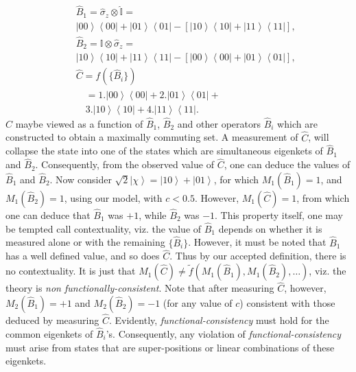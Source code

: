 \documentclass[doublecol,british]{epl2}
\theoremstyle{plain}
\theoremstyle{plain}
\theoremstyle{definition}
\theoremstyle{remark}
\theoremstyle{remark}
\theoremstyle{remark}
\theoremstyle{plain}
\theoremstyle{plain}
\theoremstyle{plain}
\theoremstyle{definition}
\theoremstyle{definition}
\begin{document}
\begin{eqnarray*}
&&\hat{B}_{1}\!=\!\hat{\sigma}_{z}\otimes\hat{\mathbb{I}}\!=\\
&&\!\left|00\right\rangle
\left\langle 00\right|+\left|01\right\rangle
\left\langle 01\right|-\left[\left|10\right\rangle
\left\langle 10\right|+\left|11\right\rangle
\left\langle 11\right|\right], \\
&&\hat{B}_{2}\!=\!\hat{\mathbb{I}}\otimes\hat{\sigma}_{z}\!=\\
&&\!\left|10\right\rangle
\left\langle 10\right|+\left|11\right\rangle
\left\langle 11\right|-\left[\left|00\right\rangle
\left\langle 00\right|+\left|01\right\rangle
\left\langle 01\right|\right], \\
&&\hat{C}=\!f(\{\hat{B}_{i}\}) \\
&&\quad=1.\left|00\right\rangle \left\langle
00\right|+2.\left|01\right\rangle \left\langle
01\right|+ \\
&&\! \quad
3.\left|10\right\rangle \left\langle
10\right|+4.\left|11\right\rangle \left\langle
11\right|. 
\end{eqnarray*}
$\hat{C}$ maybe viewed as a function of
$\hat{B}_{1}$, $\hat{B}_{2}$ and other operators
$\hat{B}_{i}$ which are constructed to obtain a
maximally commuting set. A measurement of
$\hat{C}$, will collapse the state into one of the
states which are simultaneous eigenkets of
$\hat{B}_{1}$ and $\hat{B}_{2}$. Consequently,
from the observed value of $\hat{C}$, one can
deduce the values of $\hat{B}_{1}$ and
$\hat{B}_{2}$. Now consider
$\sqrt{2}\left|\chi\right\rangle
=\left|10\right\rangle +\left|01\right\rangle $,
for which $M_{1}(\hat{B}_{1})=1$, and
$M_{1}(\hat{B}_{2})=1$, using our model, with
$c<0.5$. However, $M_{1}(\hat{C})=1$, from which
one can deduce that $\hat{B}_{1}$ was $+1$, while
$\hat{B}_{2}$ was $-1$.  This property itself, one
may be tempted call contextuality, viz.  the value
of $\hat{B}_{1}$ depends on whether it is measured
alone or with the remaining $\{\hat{B}_{i}\}$.
However, it must be noted that $\hat{B}_{1}$ has a
well defined value, and so does $\hat{C}$. Thus by
our accepted definition, there is no
contextuality. It is just that $M_{1}(\hat{C})\neq
\tilde
f(M_{1}(\hat{B}_{1}),M_{1}(\hat{B}_{2}),\dots)$,
viz. the theory is \emph{non functionally-consistent}. Note that
after measuring $\hat{C}$, however,
$M_{2}(\hat{B}_{1})=+1$ and
$M_{2}(\hat{B}_{2})=-1$ (for any value of $c$)
consistent with those deduced by measuring
$\hat{C}$.  Evidently, \emph{functional-consistency} must hold
for the common eigenkets of $\hat{B}_{i}$'s.
Consequently, any violation of \emph{functional-consistency}
must arise from states that are super-positions or
linear combinations of these eigenkets. 
\end{document}
